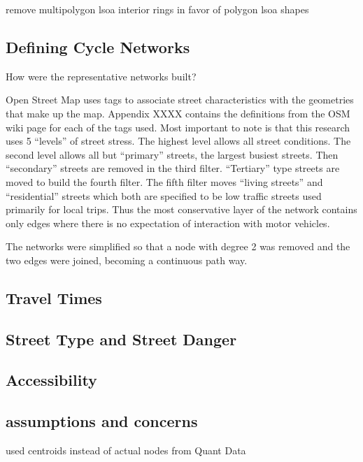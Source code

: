 \documentclass[11pt]{article} %
\begin{document}
remove multipolygon lsoa interior rings in favor of polygon lsoa shapes

\subsection{Defining Cycle Networks}

How were the representative networks built? 

Open Street Map uses tags to associate street characteristics with the geometries that make up the map. Appendix XXXX contains the definitions from the OSM wiki page for each of the tags used. Most important to note is that this research uses 5 ``levels'' of street stress. The highest level allows all street conditions. The second level allows all but ``primary'' streets, the largest busiest streets. Then ``secondary'' streets are removed in the third filter. ``Tertiary'' type streets are moved to build the fourth filter. The fifth filter moves ``living streets'' and ``residential'' streets which both are specified to be low traffic streets used primarily for local trips. Thus the most conservative layer of the network contains only edges where there is no expectation of interaction with motor vehicles. 



The networks were simplified so that a node with degree 2 was removed and the two edges were joined, becoming a continuous path way. 




\subsection{Travel Times}

\subsection{Street Type and Street Danger}

\subsection{Accessibility}

\subsection{assumptions and concerns}

used centroids instead of actual nodes from Quant Data


\end{document}

